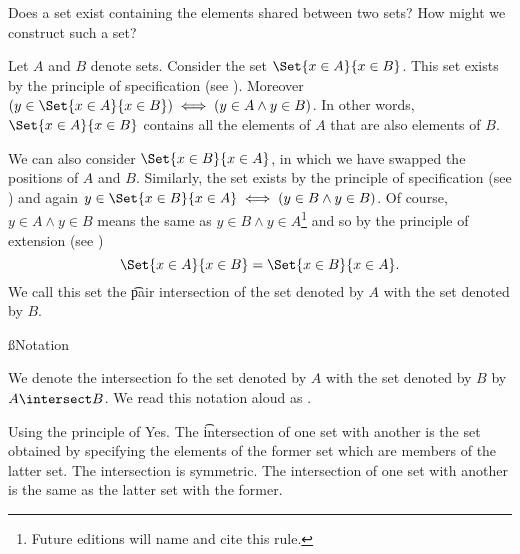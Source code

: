 

Does a set exist containing the elements shared between two sets?
How might we construct such a set?



Let $A$ and $B$ denote sets.
Consider the set $\Set{x \in A}{x \in B}$.
This set exists by the principle of specification (see ).
Moreover $(y \in \Set{x \in A}{x \in B}) \iff (y \in A \land y \in B)$.
In other words, $\Set{x \in A}{x \in B}$ contains all the elements of $A$ that are also elements of $B$.

We can also consider $\Set{x \in B}{x \in A}$, in which we have swapped the positions of $A$ and $B$.
Similarly, the set exists by the principle of specification (see ) and again $y \in \Set{x \in B}{x \in A} \iff (y \in B \land y \in B)$.
Of course, $y \in A \land y \in B$ means the same as $y \in B \land y \in A$\footnote{Future editions will name and cite this rule.} and so by the principle of extension (see )
\[
	\Set{x \in A}{x \in B} = \Set{x \in B}{x \in A}.
\]
We call this set the \t{pair intersection} of the set denoted by $A$ with the set denoted by $B$.

\ss{Notation}

We denote the intersection fo the set denoted by $A$ with the set denoted by $B$ by $A \intersect B$.
We read this notation aloud as .



Using the principle of 
Yes.
The \t{intersection} of one set with another is the set obtained by specifying the elements of the former set which are members of the latter set.
The intersection is symmetric.
The intersection of one set with another is the same as the latter set with the former.

\blankpage